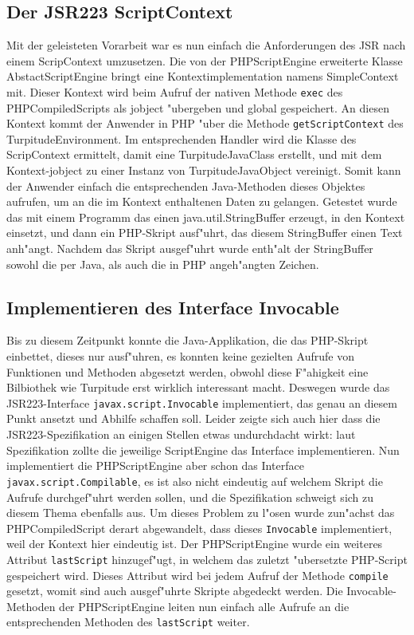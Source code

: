 \subsection{Der JSR223 ScriptContext}
\label{sec:chap1:impl:9}

Mit der geleisteten Vorarbeit war es nun einfach die Anforderungen des JSR nach einem ScripContext umzusetzen. Die von der PHPScriptEngine erweiterte Klasse
AbstactScriptEngine bringt eine Kontextimplementation namens SimpleContext mit. Dieser Kontext wird beim Aufruf der nativen Methode \texttt{exec} des PHPCompiledScripts
als jobject "ubergeben und global gespeichert. An diesen Kontext kommt der Anwender in PHP "uber die Methode \texttt{getScriptContext} des TurpitudeEnvironment. Im 
entsprechenden Handler wird die Klasse des ScripContext ermittelt, damit eine TurpitudeJavaClass erstellt, und mit dem Kontext-jobject zu einer Instanz von
TurpitudeJavaObject vereinigt. Somit kann der Anwender einfach die entsprechenden Java-Methoden dieses Objektes aufrufen, um an die im Kontext enthaltenen Daten zu
gelangen. Getestet wurde das mit einem Programm das einen java.util.StringBuffer erzeugt, in den Kontext einsetzt, und dann ein PHP-Skript ausf"uhrt, das diesem
StringBuffer einen Text anh"angt. Nachdem das Skript ausgef"uhrt wurde enth"alt der StringBuffer sowohl die per Java, als auch die in PHP angeh"angten Zeichen.

\subsection{Implementieren des Interface Invocable}
\label{sec:chap1:impl:10}

Bis zu diesem Zeitpunkt konnte die Java-Applikation, die das PHP-Skript einbettet, dieses nur ausf"uhren, es konnten keine gezielten Aufrufe von Funktionen und Methoden
abgesetzt werden, obwohl diese F"ahigkeit eine Bilbiothek wie Turpitude erst wirklich interessant macht. Deswegen wurde das JSR223-Interface \texttt{javax.script.Invocable}
implementiert, das genau an diesem Punkt ansetzt und Abhilfe schaffen soll. Leider zeigte sich auch hier dass die JSR223-Spezifikation an einigen Stellen
etwas undurchdacht wirkt: laut Spezifikation zollte die jeweilige ScriptEngine das Interface implementieren. Nun implementiert die PHPScriptEngine aber schon
das Interface \texttt{javax.script.Compilable}, es ist also nicht eindeutig auf welchem Skript die Aufrufe durchgef"uhrt werden sollen, und die Spezifikation schweigt
sich zu diesem Thema ebenfalls aus. Um dieses Problem zu l"osen wurde zun"achst das PHPCompiledScript derart abgewandelt, dass dieses \texttt{Invocable} implementiert,
weil der Kontext hier eindeutig ist. Der PHPScriptEngine wurde ein weiteres Attribut \texttt{lastScript} hinzugef"ugt, in welchem das zuletzt "ubersetzte 
PHP-Script gespeichert wird. Dieses Attribut wird bei jedem Aufruf der Methode \texttt{compile} gesetzt, womit sind auch ausgef"uhrte Skripte abgedeckt werden.
Die Invocable-Methoden der PHPScriptEngine leiten nun einfach alle Aufrufe an die entsprechenden Methoden des \texttt{lastScript} weiter.

